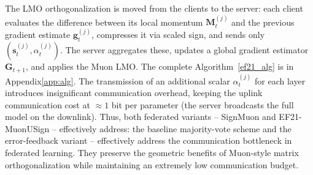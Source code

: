\documentclass[letterpaper]{article} %
\begin{document}
The LMO orthogonalization is moved from the clients to the server: each client evaluates the difference between its local momentum $\mathbf{M}_t^{(j)}$ and the previous gradient estimate $\mathbf{g}_t^{(j)}$, compresses it via scaled sign, and sends only $(\mathbf{s}_t^{(j)}, \alpha_t^{(j)})$. The server aggregates these, updates a global gradient estimator $\mathbf{G}_{t+1}$, and applies the Muon LMO. The complete Algorithm~\ref{ef21_alg} is in Appendix\ref{app:alg}. The transmission of an additional scalar $\alpha_t^{(j)}$ for each layer introduces insignificant communication overhead, keeping the uplink communication cost at $\approx 1$ bit per parameter (the server broadcasts the full model on the downlink). Thus, both federated variants -- SignMuon and EF21-MuonUSign -- effectively
address: the baseline majority-vote scheme and the error-feedback variant -- effectively address the communication bottleneck in federated learning. They preserve the geometric benefits of Muon-style matrix orthogonalization while maintaining an extremely low communication budget.
\end{document}
